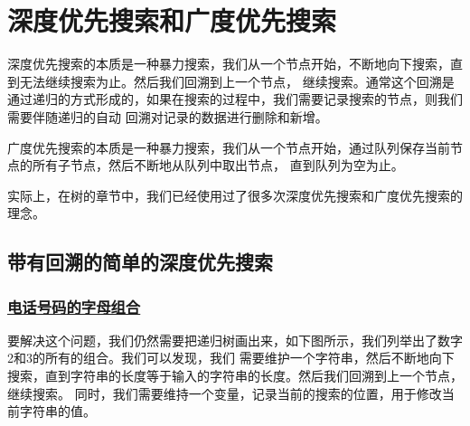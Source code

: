 \documentclass[../../main.tex]{subfiles}
\begin{document}
\setchapterpreamble[u]{\margintoc}

\chapter{深度优先搜索和广度优先搜索}

深度优先搜索的本质是一种暴力搜索，我们从一个节点开始，不断地向下搜索，直到无法继续搜索为止。然后我们回溯到上一个节点，
继续搜索。通常这个回溯是通过递归的方式形成的，如果在搜索的过程中，我们需要记录搜索的节点，则我们需要伴随递归的自动
回溯对记录的数据进行删除和新增。

广度优先搜索的本质是一种暴力搜索，我们从一个节点开始，通过队列保存当前节点的所有子节点，然后不断地从队列中取出节点，
直到队列为空为止。

实际上，在树的章节中，我们已经使用过了很多次深度优先搜索和广度优先搜索的理念。

\section{带有回溯的简单的深度优先搜索}

\subsection{\href{https://leetcode.cn/problems/letter-combinations-of-a-phone-number/}{电话号码的字母组合}}
\label{subsec:letter-combinations-of-a-phone-number}


要解决这个问题，我们仍然需要把递归树画出来，如下图所示，我们列举出了数字2和3的所有的组合。我们可以发现，我们
需要维护一个字符串，然后不断地向下搜索，直到字符串的长度等于输入的字符串的长度。然后我们回溯到上一个节点，继续搜索。
同时，我们需要维持一个变量，记录当前的搜索的位置，用于修改当前字符串的值。

\end{document}
